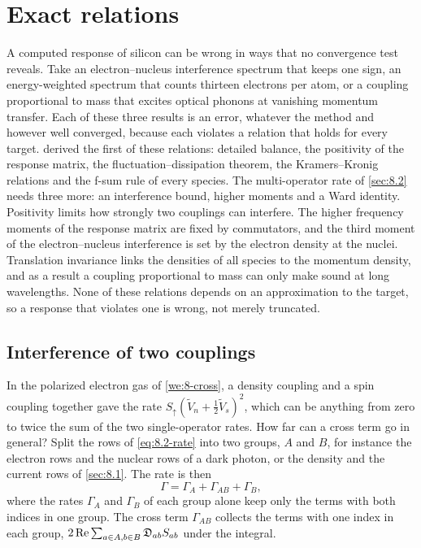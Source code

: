 \section{Exact relations}\label{sec:8.3}

A computed response of silicon can be wrong in ways that no convergence test reveals. Take an electron--nucleus interference spectrum that keeps one sign, an energy-weighted spectrum that counts thirteen electrons per atom, or a coupling proportional to mass that excites optical phonons at vanishing momentum transfer. Each of these three results is an error, whatever the method and however well converged, because each violates a relation that holds for every target.  derived the first of these relations: detailed balance, the positivity of the response matrix, the fluctuation--dissipation theorem, the Kramers--Kronig relations and the f-sum rule of every species. The multi-operator rate of \cref{sec:8.2} needs three more: an interference bound, higher moments and a Ward identity. Positivity limits how strongly two couplings can interfere. The higher frequency moments of the response matrix are fixed by commutators, and the third moment of the electron--nucleus interference is set by the electron density at the nuclei. Translation invariance links the densities of all species to the momentum density, and as a result a coupling proportional to mass can only make sound at long wavelengths. None of these relations depends on an approximation to the target, so a response that violates one is wrong, not merely truncated.

\subsection{Interference of two couplings}\label{sec:8.3-bound}

In the polarized electron gas of \cref{we:8-cross}, a density coupling and a spin coupling together gave the rate $S_\uparrow(\tilde V_n + \frac12\tilde V_s)^2$, which can be anything from zero to twice the sum of the two single-operator rates. How far can a cross term go in general? Split the rows of \cref{eq:8.2-rate} into two groups, $A$ and $B$, for instance the electron rows and the nuclear rows of a dark photon, or the density and the current rows of \cref{sec:8.1}. The rate is then
\begin{equation*}
  \varGamma = \varGamma_A + \varGamma_{AB} + \varGamma_B ,
\end{equation*}
where the rates $\varGamma_A$ and $\varGamma_B$ of each group alone keep only the terms with both indices in one group. The cross term $\varGamma_{AB}$ collects the terms with one index in each group, $2\operatorname{Re}\sum_{a\in A,b\in B}\mathfrak{D}_{ab}S_{ab}$ under the integral.

